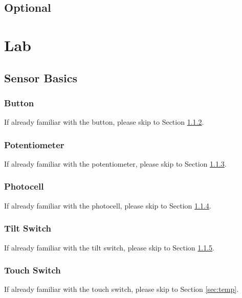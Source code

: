 \documentclass[12pt,letterpaper,oneside]{article}
\begin{document}
		\subsection{Optional}

\section{Lab}
		\subsection{Sensor Basics}
			\subsubsection{Button}
			If already familiar with the button, please skip to Section \ref{sec:potentiometer}. 

			\subsubsection{Potentiometer} \label{sec:potentiometer}
			If already familiar with the potentiometer, please skip to Section \ref{sec:photocell}. 
			
			\subsubsection{Photocell} \label{sec:photocell}
			If already familiar with the photocell, please skip to Section \ref{sec:tilt}. 
			
			\subsubsection{Tilt Switch} \label{sec:tilt}
			If already familiar with the tilt switch, please skip to Section \ref{sec:touch}. 

			\subsubsection{Touch Switch} \label{sec:touch}
			If already familiar with the touch switch, please skip to Section \ref{sec:temp}. 
				
\end{document}
